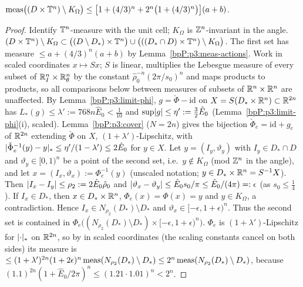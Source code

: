 \begin{lemma}\label{bpP:p3:meas-torus}
$\operatorname{meas}\bigl((D\times\mathbb{T}^n)\setminus K_\Omega\bigr)\le\bigl[1+(4/3)^n+2^n\bigl(1+(4/3)^n\bigr)\bigr](a+b)$.
\end{lemma}
\begin{proof}
Identify $\mathbb{T}^n$-measure with the unit cell; $K_\Omega$ is $\mathbb{Z}^n$-invariant in the angle.
\label{stepP:p3:mt-split}
$(D\times\mathbb{T}^n)\setminus K_\Omega\subset\bigl((D\setminus D_*)\times\mathbb{T}^n\bigr)\cup\bigl(((D_*\cap D)\times\mathbb{T}^n)\setminus K_\Omega\bigr)$. The first set has measure $\le a+(4/3)^n(a+b)$ by Lemma~\ref{bpP:p3:meas-actions}.
\label{stepP:p3:mt-ext}
Work in scaled coordinates $x\mapsto Sx$; $S$ is linear, multiplies the Lebesgue measure of every subset of $\mathbb{R}^n_I\times\mathbb{R}^n_\theta$ by the constant $\hat\rho_0^{-n}(2\pi/s_0)^n$ and maps products to products, so all comparisons below between measures of subsets of $\mathbb{R}^n\times\mathbb{R}^n$ are unaffected. By Lemma~\ref{bpP:p3:limit-phi}, $g=\check\Phi-\mathrm{id}$ on $X=S(D_*\times\mathbb{R}^n)\subset\mathbb{R}^{2n}$ has $L_*(g)\le\lambda':=768n\hat E_0<\frac1{10}$ and $\sup\lvert g\rvert\le\eta':=\frac32\hat E_0$ (Lemma~\ref{bpP:p3:limit-phi}(i), scaled). Lemma~\ref{bpP:p3:cover} ($N=2n$) gives the bijection $\check\Phi_e=\mathrm{id}+g_e$ of $\mathbb{R}^{2n}$ extending $\check\Phi$ on $X$, $(1+\lambda')$-Lipschitz, with $\lvert \check\Phi_e^{-1}(y)-y\rvert_*\le\eta'/(1-\lambda')\le2\hat E_0$ for $y\in X$.
\label{stepP:p3:mt-pre}
Let $y=(I_y,\vartheta_y)$ with $I_y\in D_*\cap D$ and $\vartheta_y\in[0,1)^n$ be a point of the second set, i.e.\ $y\notin K_\Omega$ (mod $\mathbb{Z}^n$ in the angle), and let $x=(I_x,\vartheta_x):=\Phi_e^{-1}(y)$ (unscaled notation; $y\in D_*\times\mathbb{R}^n=S^{-1}X$). Then $\lvert I_x-I_y\rvert\le\rho_2:=2\hat E_0\hat\rho_0$ and $\lvert \vartheta_x-\vartheta_y\rvert\le\hat E_0s_0/\pi\le\hat E_0/(4\pi)=:\epsilon$ (as $s_0\le\frac14$). If $I_x\in D_*$, then $x\in D_*\times\mathbb{R}^n$, $\Phi_e(x)=\Phi(x)=y$ and $y\in K_\Omega$, a contradiction. Hence $I_x\in N_{\rho_2}(D_*)\setminus D_*$ and $\vartheta_x\in[-\epsilon,1+\epsilon)^n$.
\label{stepP:p3:mt-meas}
Thus the second set is contained in $\Phi_e\bigl((N_{\rho_2}(D_*)\setminus D_*)\times[-\epsilon,1+\epsilon)^n\bigr)$. $\Phi_e$ is $(1+\lambda')$-Lipschitz for $\lvert \cdot\rvert_*$ on $\mathbb{R}^{2n}$, so by  in scaled coordinates (the scaling constants cancel on both sides) its measure is $\le(1+\lambda')^{2n}(1+2\epsilon)^n\operatorname{meas}(N_{\rho_2}(D_*)\setminus D_*)\le2^n\operatorname{meas}(N_{\rho_2}(D_*)\setminus D_*)$, because $(1.1)^{2n}(1+\hat E_0/2\pi)^n\le(1.21\cdot1.01)^n<2^n$.

\end{proof}
